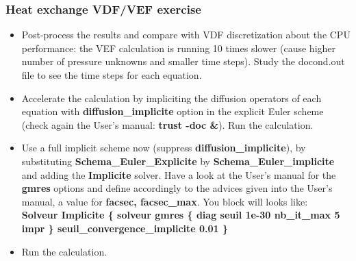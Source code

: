 \documentclass[10pt]{beamer}
\begin{document}
\begin{frame}
\frametitle{Heat exchange VDF/VEF exercise}
\begin{block}{}

\begin{itemize}
\item Post-process the results and compare with VDF discretization about the CPU performance: the VEF calculation is running 10 times slower (cause higher number of pressure unknowns and smaller time steps). Study the docond.out file to see the time steps for each equation.

\item Accelerate the calculation by impliciting the diffusion operators of each equation with \textbf{diffusion\_implicite} option in the explicit Euler scheme (check again the User's manual: \textbf{trust -doc \&}). Run the calculation.

\item \label{schema_impl} Use a full implicit scheme now (suppress \textbf{diffusion\_implicite}), by substituting \textbf{Schema\_Euler\_Explicite} by \textbf{Schema\_Euler\_implicite} and adding the \textbf{Implicite} solver. Have a look at the User's manual for the \textbf{gmres} options and define accordingly to the advices given into the User's manual, a value for \textbf{facsec, facsec\_max}. You block will looks like:\\
\textbf{Solveur Implicite \{ solveur gmres \{ diag seuil 1e-30 nb\_it\_max 5 impr \}  seuil\_convergence\_implicite 0.01  \} }

\item Run the calculation.
\end{itemize}

\end{block}
\end{frame}
\end{document}
